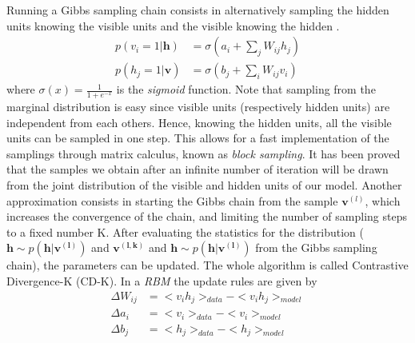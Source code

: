 \documentclass[letterpaper]{article}
\begin{document}
Running a Gibbs sampling chain consists in alternatively sampling the hidden units knowing the visible units and the visible knowing the hidden .
\begin{align}
\label{eq:marginal_RBM}
p(v_{i}=1|\bm{h}) &= \sigma \left( a_{i} + \sum_{j}W_{ij}h_{j} \right)\\
p(h_{j}=1|\bm{v}) &= \sigma \left( b_{j} + \sum_{i}W_{ij}v_{i} \right)
\end{align}
where $\sigma	(x) = \frac{1}{1+e^{-x}}$ is the \textit{sigmoid} function. Note that sampling from the marginal distribution is easy since visible units (respectively hidden units) are independent from each others. Hence, knowing the hidden units, all the visible units can be sampled in one step. This allows for a fast implementation of the samplings through matrix calculus, known as \textit{block sampling}.
It has been proved \cite{bengio2009learning} that the samples we obtain after an infinite number of iteration will be drawn from the joint distribution of the visible and hidden units of our model. Another approximation consists in starting the Gibbs chain from the sample $\bm{v}^{(l)}$, which increases the convergence of the chain, and limiting the number of sampling steps to a fixed number K. After evaluating the statistics for the distribution ($\bm{h} \sim p(\bm{h}|\bm{v^{(l)}})$ and $\bm{v^{(l,k)}}$ and $\bm{h}\sim p(\bm{h}|\bm{v^{(l)}})$ from the Gibbs sampling chain), the parameters can be updated. The whole algorithm is called Contrastive Divergence-K (CD-K). In a \textit{RBM} the update rules are given by
\begin{align}
\Delta W_{ij} &= <v_{i}h_{j} >_{data} - <v_{i}h_{j} >_{model}\\
\Delta a_{i} &= <v_{i}>_{data} - <v_{i}>_{model}\\
\Delta b_{j} &= <h_{j} >_{data} - <h_{j} >_{model}
\end{align}
\end{document}
